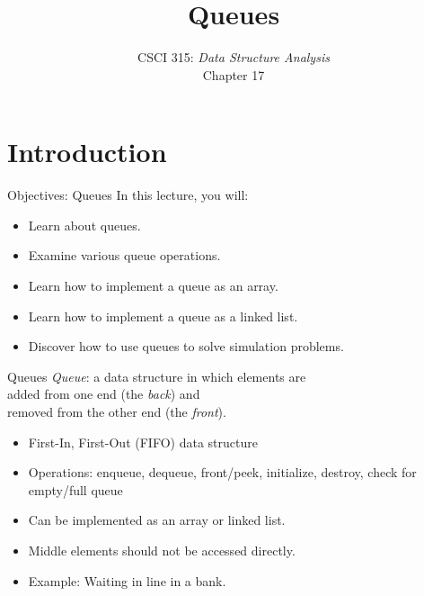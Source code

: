 \documentclass[14pt,aspectratio=1610]{beamer}
\title{\Huge{} Queues}
\subtitle{CSCI 315: \textit{Data Structure Analysis}\\Chapter 17}
\institute{Charleston Southern University}
\begin{document}
\begin{frame}
  \titlepage{}
\end{frame}

\section{Introduction}

\begin{frame}{Objectives: Queues}
In this lecture, you will:
\begin{itemize}
\item
  Learn about queues.
\item
  Examine various queue operations.
\item
  Learn how to implement a queue as an array.
\item
  Learn how to implement a queue as a linked list.
\item
  Discover how to use queues to solve simulation problems.
\end{itemize}
\end{frame}

\begin{frame}{Queues}
  \emph{Queue}: a data structure in which elements are\\
  added from one end (the \textit{back}) and\\
  removed from the other end (the \textit{front}).

  \begin{itemize}
    \item
      First-In, First-Out (FIFO) data structure
    \item
      Operations: enqueue, dequeue, front/peek, initialize, destroy, check for empty/full queue
    \item
      Can be implemented as an array or linked list.
    \item
      Middle elements should not be accessed directly.
    \item
      Example: Waiting in line in a bank.
  \end{itemize}
\end{frame}
\end{document}
